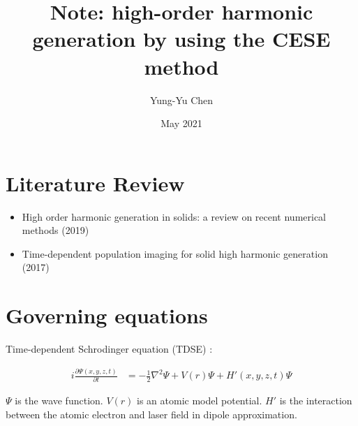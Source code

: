 \documentclass{isildur}
\title{
%
Note: high-order harmonic generation by using the CESE method
%
}
\author{
%
Yung-Yu Chen
%
}
\date{May 2021}
\begin{document}
\maketitle

\tableofcontents

\chapter{Literature Review}
\label{c:review}

\begin{itemize}
  \item High order harmonic generation in solids: a review on recent numerical
  methods (2019) \cite{yu_high_2019}
  \item Time-dependent population imaging for solid high harmonic generation
  (2017) \cite{liu_time-dependent_2017}
\end{itemize}

\chapter{Governing equations}
\label{c:goveq}

Time-dependent Schrodinger equation (TDSE) \cite{briggs_derivation_2007}:

\begin{align}
  i\frac{\partial \Psi(x, y, z, t)}{\partial t}
  &= -\frac{1}{2}\nabla^2\Psi + V(r)\Psi + H'(x, y, z, t)\Psi
\end{align}

$\Psi$ is the wave function.  $V(r)$ is an atomic model potential.  $H'$ is the
interaction between the atomic electron and laser field in dipole
approximation.

\clearpage
{}


\end{document}
